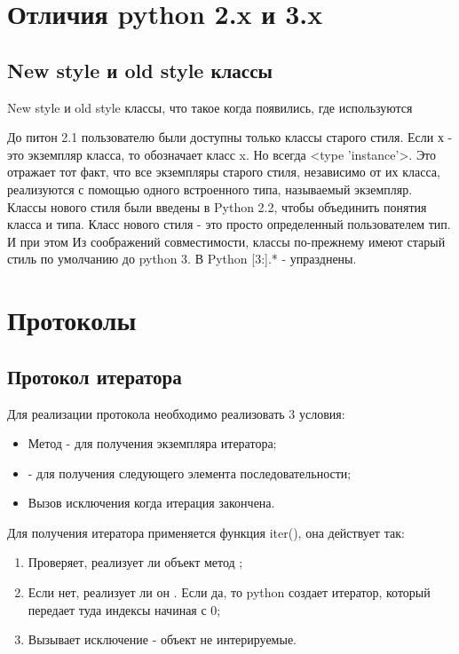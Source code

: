 \section{Отличия python 2.x и 3.x}

\subsection{New style и old style классы}

New style и old style классы, что такое когда появились, где используются

До питон 2.1 пользователю были доступны только классы старого стиля. Если х - это экземпляр класса, то  обозначает класс x. Но  всегда <type 'instance'>. Это отражает тот факт, что все экземпляры старого стиля, независимо от их класса, реализуются с помощью одного встроенного типа, называемый экземпляр.
Классы нового стиля были введены в Python 2.2, чтобы объединить понятия класса и типа. Класс нового стиля - это просто определенный пользователем тип. И при этом 
Из соображений совместимости, классы по-прежнему имеют старый стиль по умолчанию до python 3. В Python [3:].* - упразднены. 

\section{Протоколы}

\subsection{Протокол итератора}

Для реализации протокола необходимо реализовать 3 условия:
\begin{itemize}
    \item Метод  - для получения экземпляра итератора;
    \item {} - для получения следующего элемента последовательности;
    \item Вызов исключения  когда итерация закончена. 
\end{itemize}

Для получения итератора применяется функция iter(), она действует так:
\begin{enumerate}
    \item Проверяет, реализует ли объект метод ;
    \item Если нет, реализует ли он . Если да, то python создает итератор, который передает туда индексы начиная с 0;
    \item Вызывает исключение - объект не интерируемые.
\end{enumerate}

